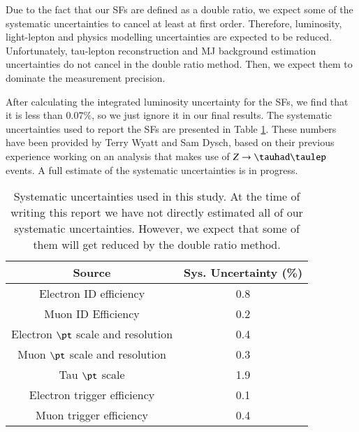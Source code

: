 Due to the fact that our SFs are defined as a double ratio, we expect some of the systematic uncertainties to cancel at least at first order. Therefore, luminosity, light-lepton and physics modelling uncertainties are expected to be reduced. Unfortunately, tau-lepton reconstruction and MJ background estimation uncertainties do not cancel in the double ratio method. Then, we expect them to dominate the measurement precision.

After calculating the integrated luminosity uncertainty for the SFs, we find that it is less than $0.07\%$, so we just ignore it in our final results. The systematic uncertainties used to report the SFs are presented in Table \ref{Tab5}. These numbers have been provided by Terry Wyatt and Sam Dysch, based on their previous experience working on an analysis that makes use of $Z\to\tauhad\taulep$ events. A full estimate of the systematic uncertainties is in progress.
\begin{table}[htbp]
	\centering
	\begin{tabular}{cc}
		\hline
		\multicolumn{1}{|c|}{Source}        & \multicolumn{1}{c|}{Sys. Uncertainty (\%)} \\ \hline
		Electron ID efficiency              & 0.8                                        \\
		Muon ID Efficiency                  & 0.2                                        \\
		Electron $\pt$ scale and resolution & 0.4                                        \\
		Muon $\pt$ scale and resolution     & 0.3                                        \\
		Tau $\pt$ scale                     & 1.9                                        \\
		Electron trigger efficiency         & 0.1                                        \\
		Muon trigger efficiency             & 0.4                                        \\ 
	\end{tabular}
	\caption{Systematic uncertainties used in this study. At the time of writing this report we have not directly estimated all of our systematic uncertainties. However, we expect that some of them will get reduced by the double ratio method.}
	\label{Tab5}
\end{table}

